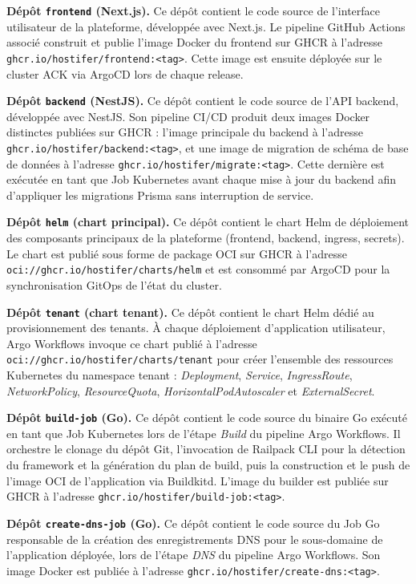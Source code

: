 \textbf{Dépôt \texttt{frontend} (Next.js).} Ce dépôt contient le code source de l'interface utilisateur de la plateforme, développée avec Next.js. Le pipeline GitHub Actions associé construit et publie l'image Docker du frontend sur GHCR à l'adresse \texttt{ghcr.io/hostifer/frontend:<tag>}. Cette image est ensuite déployée sur le cluster ACK via ArgoCD lors de chaque release.

\textbf{Dépôt \texttt{backend} (NestJS).} Ce dépôt contient le code source de l'API backend, développée avec NestJS. Son pipeline CI/CD produit deux images Docker distinctes publiées sur GHCR : l'image principale du backend à l'adresse \\ \texttt{ghcr.io/hostifer/backend:<tag>}, et une image de migration de schéma de base de données à l'adresse \texttt{ghcr.io/hostifer/migrate:<tag>}. Cette dernière est exécutée en tant que Job Kubernetes avant chaque mise à jour du backend afin d'appliquer les migrations Prisma sans interruption de service.

\textbf{Dépôt \texttt{helm} (chart principal).} Ce dépôt contient le chart Helm de déploiement des composants principaux de la plateforme (frontend, backend, ingress, secrets). Le chart est publié sous forme de package OCI sur GHCR à l'adresse \texttt{oci://ghcr.io/hostifer/charts/helm} et est consommé par ArgoCD pour la synchronisation GitOps de l'état du cluster.

\textbf{Dépôt \texttt{tenant} (chart tenant).} Ce dépôt contient le chart Helm dédié au provisionnement des tenants. À chaque déploiement d'application utilisateur, Argo Workflows invoque ce chart publié à l'adresse \texttt{oci://ghcr.io/hostifer/charts/tenant} pour créer l'ensemble des ressources Kubernetes du namespace tenant : \textit{Deployment}, \textit{Service}, \textit{IngressRoute}, \textit{NetworkPolicy}, \textit{ResourceQuota}, \textit{HorizontalPodAutoscaler} et \textit{ExternalSecret}.

\textbf{Dépôt \texttt{build-job} (Go).} Ce dépôt contient le code source du binaire Go exécuté en tant que Job Kubernetes lors de l'étape \textit{Build} du pipeline Argo Workflows. Il orchestre le clonage du dépôt Git, l'invocation de Railpack CLI pour la détection du framework et la génération du plan de build, puis la construction et le push de l'image OCI de l'application via Buildkitd. L'image du builder est publiée sur GHCR à l'adresse \texttt{ghcr.io/hostifer/build-job:<tag>}.

\textbf{Dépôt \texttt{create-dns-job} (Go).} Ce dépôt contient le code source du Job Go responsable de la création des enregistrements DNS pour le sous-domaine de l'application déployée, lors de l'étape \textit{DNS} du pipeline Argo Workflows. Son image Docker est publiée à l'adresse \texttt{ghcr.io/hostifer/create-dns:<tag>}.

